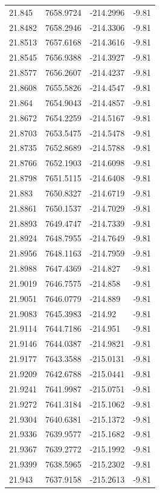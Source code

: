 \begin{table}[H]
\begin{tabular}{llll}
21.845 & 7658.9724 & -214.2996 & -9.81 \\
21.8482 & 7658.2946 & -214.3306 & -9.81 \\
21.8513 & 7657.6168 & -214.3616 & -9.81 \\
21.8545 & 7656.9388 & -214.3927 & -9.81 \\
21.8577 & 7656.2607 & -214.4237 & -9.81 \\
21.8608 & 7655.5826 & -214.4547 & -9.81 \\
21.864 & 7654.9043 & -214.4857 & -9.81 \\
21.8672 & 7654.2259 & -214.5167 & -9.81 \\
21.8703 & 7653.5475 & -214.5478 & -9.81 \\
21.8735 & 7652.8689 & -214.5788 & -9.81 \\
21.8766 & 7652.1903 & -214.6098 & -9.81 \\
21.8798 & 7651.5115 & -214.6408 & -9.81 \\
21.883 & 7650.8327 & -214.6719 & -9.81 \\
21.8861 & 7650.1537 & -214.7029 & -9.81 \\
21.8893 & 7649.4747 & -214.7339 & -9.81 \\
21.8924 & 7648.7955 & -214.7649 & -9.81 \\
21.8956 & 7648.1163 & -214.7959 & -9.81 \\
21.8988 & 7647.4369 & -214.827 & -9.81 \\
21.9019 & 7646.7575 & -214.858 & -9.81 \\
21.9051 & 7646.0779 & -214.889 & -9.81 \\
21.9083 & 7645.3983 & -214.92 & -9.81 \\
21.9114 & 7644.7186 & -214.951 & -9.81 \\
21.9146 & 7644.0387 & -214.9821 & -9.81 \\
21.9177 & 7643.3588 & -215.0131 & -9.81 \\
21.9209 & 7642.6788 & -215.0441 & -9.81 \\
21.9241 & 7641.9987 & -215.0751 & -9.81 \\
21.9272 & 7641.3184 & -215.1062 & -9.81 \\
21.9304 & 7640.6381 & -215.1372 & -9.81 \\
21.9336 & 7639.9577 & -215.1682 & -9.81 \\
21.9367 & 7639.2772 & -215.1992 & -9.81 \\
21.9399 & 7638.5965 & -215.2302 & -9.81 \\
21.943 & 7637.9158 & -215.2613 & -9.81 \\

\end{tabular}
\end{table}
